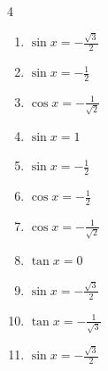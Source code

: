 \begin{multicols}{4}
\begin{enumerate}

\columnbreak %

  \item $\displaystyle \sin{x}  = -\frac{\sqrt{3}}{2}$


  \item $\displaystyle \sin{x}  = -\frac{1}{2}$


  \item $\displaystyle \cos{x}  = -\frac{1}{\sqrt{2}}$


  \item $\displaystyle \sin{x}  = 1$


  \item $\displaystyle \sin{x}  = -\frac{1}{2}$


  \item $\displaystyle \cos{x}  = -\frac{1}{2}$


  \item $\displaystyle \cos{x}  = -\frac{1}{\sqrt{2}}$


  \item $\displaystyle \tan{x}  = 0$


  \item $\displaystyle \sin{x}  = -\frac{\sqrt{3}}{2}$


  \item $\displaystyle \tan{x}  = -\frac{1}{\sqrt{3}}$


  \item $\displaystyle \sin{x}  = -\frac{\sqrt{3}}{2}$


\end{enumerate}
\end{multicols}
